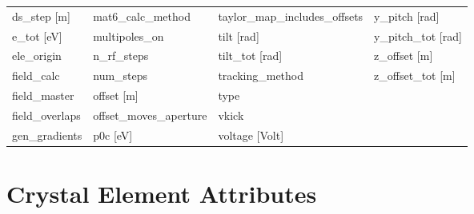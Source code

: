 \begin{tabular}{llll}
ds_step [m]                      & mat6_calc_method                 & taylor_map_includes_offsets      & y_pitch [rad]                    \\
e_tot [eV]                       & multipoles_on                    & tilt [rad]                       & y_pitch_tot [rad]                \\
ele_origin                       & n_rf_steps                       & tilt_tot [rad]                   & z_offset [m]                     \\
field_calc                       & num_steps                        & tracking_method                  & z_offset_tot [m]                 \\
field_master                     & offset [m]                       & type                             &                                  \\
field_overlaps                   & offset_moves_aperture            & vkick                            &                                  \\
gen_gradients                    & p0c [eV]                         & voltage [Volt]                   &                                  \\
 \bottomrule
 \end{tabular}
 \vfill
 
 \section{Crystal Element Attributes}
 \label{s:list.crystal}
 
